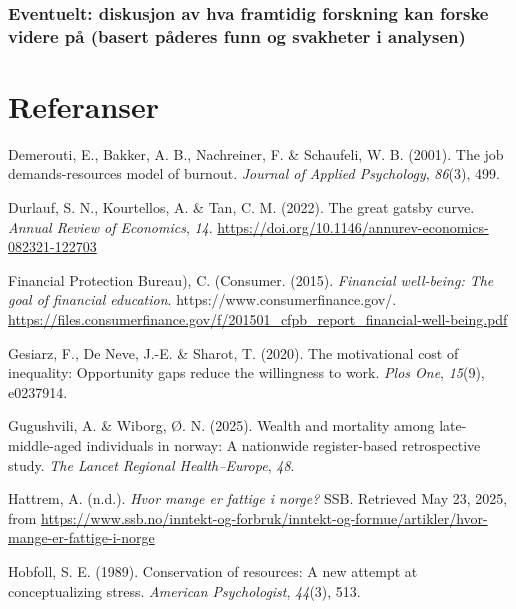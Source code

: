 \documentclass[
  12pt,
  a4paper,
  DIV=11,
  numbers=noendperiod]{scrartcl}
\newlength{\cslhangindent}
\newenvironment{CSLReferences}[2] %
 {\begin{list}{}{%
  \setlength{\itemindent}{0pt}
  \setlength{\leftmargin}{0pt}
  \setlength{\parsep}{0pt}
  \ifodd #1
   \setlength{\leftmargin}{\cslhangindent}
   \setlength{\itemindent}{-1\cslhangindent}
  \fi
  \setlength{\itemsep}{#2\baselineskip}}}
 {\end{list}}
\begin{document}
\subsubsection{Eventuelt: diskusjon av hva framtidig forskning kan
forske videre på (basert påderes funn og svakheter i
analysen)}\label{eventuelt-diskusjon-av-hva-framtidig-forskning-kan-forske-videre-puxe5-basert-puxe5deres-funn-og-svakheter-i-analysen}

\newpage

\section*{Referanser}\label{referanser}

\label{refs}
\begin{CSLReferences}{1}{0}
Demerouti, E., Bakker, A. B., Nachreiner, F. \& Schaufeli, W. B. (2001).
The job demands-resources model of burnout. \emph{Journal of Applied
Psychology}, \emph{86}(3), 499.

Durlauf, S. N., Kourtellos, A. \& Tan, C. M. (2022). The great gatsby
curve. \emph{Annual Review of Economics}, \emph{14}.
\url{https://doi.org/10.1146/annurev-economics-082321-122703}

Financial Protection Bureau), C. (Consumer. (2015). \emph{Financial
well-being: The goal of financial education}.
https://www.consumerfinance.gov/.
\url{https://files.consumerfinance.gov/f/201501_cfpb_report_financial-well-being.pdf}

Gesiarz, F., De Neve, J.-E. \& Sharot, T. (2020). The motivational cost
of inequality: Opportunity gaps reduce the willingness to work.
\emph{Plos One}, \emph{15}(9), e0237914.

Gugushvili, A. \& Wiborg, Ø. N. (2025). Wealth and mortality among
late-middle-aged individuals in norway: A nationwide register-based
retrospective study. \emph{The Lancet Regional Health--Europe},
\emph{48}.

Hattrem, A. (n.d.). \emph{Hvor mange er fattige i norge?} SSB. Retrieved
May 23, 2025, from
\url{https://www.ssb.no/inntekt-og-forbruk/inntekt-og-formue/artikler/hvor-mange-er-fattige-i-norge}

Hobfoll, S. E. (1989). Conservation of resources: A new attempt at
conceptualizing stress. \emph{American Psychologist}, \emph{44}(3), 513.


\end{CSLReferences}
\end{document}

